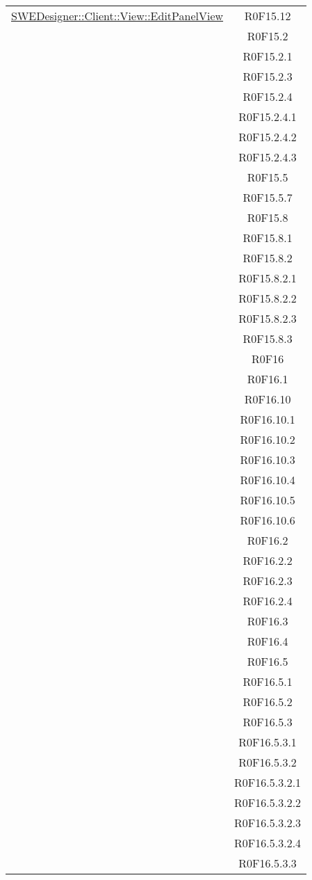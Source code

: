 \documentclass[../DefinizioneDiProdotto.tex]{subfiles}
\begin{document}
\begin{longtable}{|c|c|}
				\hyperlink{SWEDesigner::Client::View::EditPanelView}{SWEDesigner::Client::View::EditPanelView}
				& R0F15.12\\
				& R0F15.2\\
				& R0F15.2.1\\
				& R0F15.2.3\\
				& R0F15.2.4\\
				& R0F15.2.4.1\\
				& R0F15.2.4.2\\
				& R0F15.2.4.3\\
				& R0F15.5\\
				& R0F15.5.7\\
				& R0F15.8\\
				& R0F15.8.1\\
				& R0F15.8.2\\
				& R0F15.8.2.1\\
				& R0F15.8.2.2\\
				& R0F15.8.2.3\\
				& R0F15.8.3\\
				& R0F16\\
				& R0F16.1\\
				& R0F16.10\\
				& R0F16.10.1\\
				& R0F16.10.2\\
				& R0F16.10.3\\
				& R0F16.10.4\\
				& R0F16.10.5\\
				& R0F16.10.6\\
				& R0F16.2\\
				& R0F16.2.2\\
				& R0F16.2.3\\
				& R0F16.2.4\\
				& R0F16.3\\
				& R0F16.4\\
				& R0F16.5\\
				& R0F16.5.1\\
				& R0F16.5.2\\
				& R0F16.5.3\\
				& R0F16.5.3.1\\
				& R0F16.5.3.2\\
				& R0F16.5.3.2.1\\
				& R0F16.5.3.2.2\\
				& R0F16.5.3.2.3\\
				& R0F16.5.3.2.4\\
				& R0F16.5.3.3\\

\end{longtable}
\end{document}
